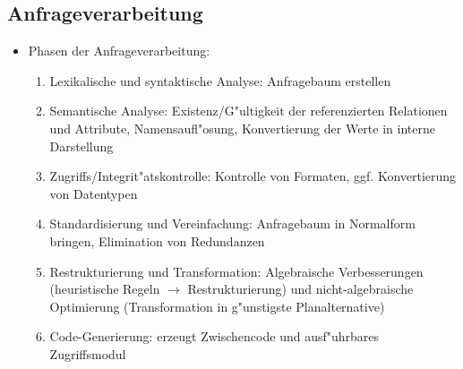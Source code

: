 \documentclass[a4paper, 12pt]{scrartcl}
\begin{document}
\subsection{Anfrageverarbeitung}
\begin{itemize}
	\item
		Phasen der Anfrageverarbeitung:
		\begin{enumerate}
			\item
				Lexikalische und syntaktische Analyse: Anfragebaum erstellen
			\item
				Semantische Analyse: Existenz/G"ultigkeit der referenzierten Relationen und Attribute, Namensaufl"osung, Konvertierung der Werte in interne Darstellung
			\item
				Zugriffs/Integrit"atskontrolle: Kontrolle von Formaten, ggf. Konvertierung von Datentypen
			\item
				Standardisierung und Vereinfachung: Anfragebaum in Normalform bringen, Elimination von Redundanzen
			\item
				Restrukturierung und Transformation: Algebraische Verbesserungen (heuristische Regeln $\rightarrow$ Restrukturierung) und nicht-algebraische Optimierung (Transformation in g"unstigste  Planalternative)
			\item
				Code-Generierung: erzeugt Zwischencode und ausf"uhrbares Zugriffsmodul
	\end{enumerate}
\end{itemize}
\end{document}
